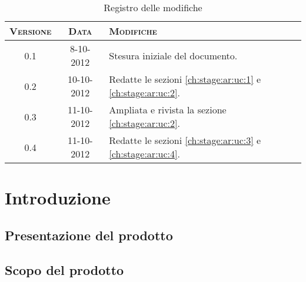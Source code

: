 \documentclass[10pt,a4paper,headinclude,footinclude,hidelinks]{scrreprt} %
\begin{document}
    \title{\rmfamily\normalfont{}}
    \author{}
    \date{\today}
    
    \maketitle
    
    \begin{abstract}
        \noindent Il documento illustra i casi d'uso e i requisiti dell'interfaccia grafica per la visualizzazione e la navigazione dei contenuti.
    \end{abstract}
    
	\begin{table}[ht]
	\centering
	\begin{tabular}{|c|c|l|}
	\hline
	\textsc{Versione} & \textsc{Data} & \textsc{Modifiche} \\ \hline
	0.1 & 8-10-2012 & Stesura iniziale del documento. \\ \hline
	0.2 & 10-10-2012 & Redatte le sezioni \ref{ch:stage:ar:uc:1} e \ref{ch:stage:ar:uc:2}. \\ \hline
	0.3 & 11-10-2012 & Ampliata e rivista la sezione \ref{ch:stage:ar:uc:2}. \\ \hline
	0.4 & 11-10-2012 & Redatte le sezioni \ref{ch:stage:ar:uc:3} e \ref{ch:stage:ar:uc:4}. \\ \hline

	\end{tabular}
	\caption{Registro delle modifiche}
	\label{tab:stage:wp:workload}
	\end{table}

	\tableofcontents

	\chapter{Introduzione}
	\label{ch:stage:ar:intro}

	\section{Presentazione del prodotto}
	\label{sec:stage:ar:intro:presentazione}

	\section{Scopo del prodotto}
	\label{sec:stage:ar:intro:scopo}
\end{document}
